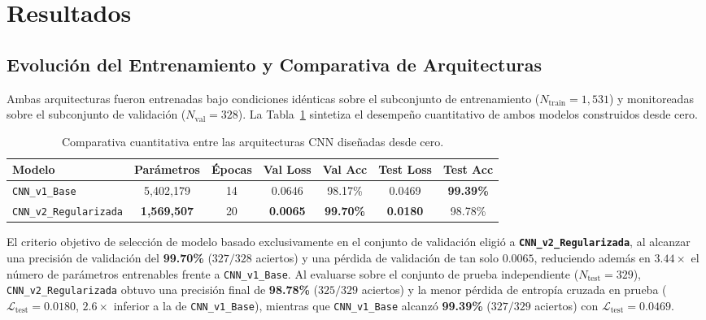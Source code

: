 \section{Resultados}

\subsection{Evolución del Entrenamiento y Comparativa de Arquitecturas}

Ambas arquitecturas fueron entrenadas bajo condiciones idénticas sobre el subconjunto de entrenamiento ($N_{\text{train}} = 1,531$) y monitoreadas sobre el subconjunto de validación ($N_{\text{val}} = 328$). La Tabla~\ref{tab:comparativa_modelos} sintetiza el desempeño cuantitativo de ambos modelos construidos desde cero.

\begin{table}[H]
    \centering
    \caption{Comparativa cuantitativa entre las arquitecturas CNN diseñadas desde cero.}
    \label{tab:comparativa_modelos}
    \begin{tabular}{lcccccc}
        \toprule
        \textbf{Modelo} & \textbf{Parámetros} & \textbf{Épocas} & \textbf{Val Loss} & \textbf{Val Acc} & \textbf{Test Loss} & \textbf{Test Acc} \\
        \midrule
        \texttt{CNN\_v1\_Base}         & 5,402,179 & 14 & 0.0646 & 98.17\% & 0.0469 & \textbf{99.39\%} \\
        \texttt{CNN\_v2\_Regularizada} & \textbf{1,569,507} & 20 & \textbf{0.0065} & \textbf{99.70\%} & \textbf{0.0180} & 98.78\% \\
        \bottomrule
    \end{tabular}
\end{table}

El criterio objetivo de selección de modelo basado exclusivamente en el conjunto de validación eligió a \textbf{\texttt{CNN\_v2\_Regularizada}}, al alcanzar una precisión de validación del \textbf{99.70\%} ($327/328$ aciertos) y una pérdida de validación de tan solo $0.0065$, reduciendo además en \textbf{$3.44\times$} el número de parámetros entrenables frente a \texttt{CNN\_v1\_Base}. Al evaluarse sobre el conjunto de prueba independiente ($N_{\text{test}} = 329$), \texttt{CNN\_v2\_Regularizada} obtuvo una precisión final de \textbf{98.78\%} ($325/329$ aciertos) y la menor pérdida de entropía cruzada en prueba (\textbf{$\mathcal{L}_{\text{test}} = 0.0180$}, $2.6\times$ inferior a la de \texttt{CNN\_v1\_Base}), mientras que \texttt{CNN\_v1\_Base} alcanzó \textbf{99.39\%} ($327/329$ aciertos) con $\mathcal{L}_{\text{test}} = 0.0469$.

